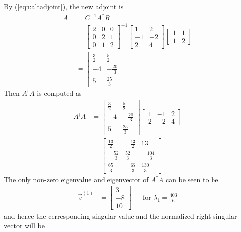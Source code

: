 \begin{solution}
By (\ref{eqn:altadjoint}), the new adjoint is
\begin{align*}
A^\dag &= C^{-1} A^* B \\
&= \begin{bmatrix}
2 & 0 & 0 \\
0 & 2 & 1 \\
0 & 1 & 2
\end{bmatrix}^{-1}
\begin{bmatrix}
1 & 2 \\
-1 & -2 \\
2 & 4
\end{bmatrix} 
\begin{bmatrix}
1 & 1 \\
1 & 2
\end{bmatrix} \\
&=
\begin{bmatrix}
\frac{3}{2} & \frac{5}{2}\\ 
-4 & -\frac{20}{3}\\ 
5 & \frac{25}{3}
\end{bmatrix}
\end{align*}
Then $A^\dag A$ is computed as
\begin{align*}
A^\dag A &= \begin{bmatrix}
\frac{3}{2} & \frac{5}{2}\\ 
-4 & -\frac{20}{3}\\ 
5 & \frac{25}{3}
\end{bmatrix}
\begin{bmatrix}
1 & -1 & 2 \\
2 & -2 & 4
\end{bmatrix} \\
&= \begin{bmatrix}
\frac{13}{2} & -\frac{13}{2} & 13\\ 
-\frac{52}{3} & \frac{52}{3} & -\frac{104}{3}\\ 
\frac{65}{3} & -\frac{65}{3} & \frac{130}{3}
\end{bmatrix}
\end{align*}
The only non-zero eigenvalue and eigenvector of $A^\dag A$ can be seen to be
\begin{align*} \vec{v}^{(1)} &=
\begin{bmatrix}
3\\ 
-8\\ 
10
\end{bmatrix} & & \text {for $\lambda_1 = \frac{403}{6}$}
\end{align*}
and hence the corresponding singular value and the normalized right singular vector will be

\end{solution}

